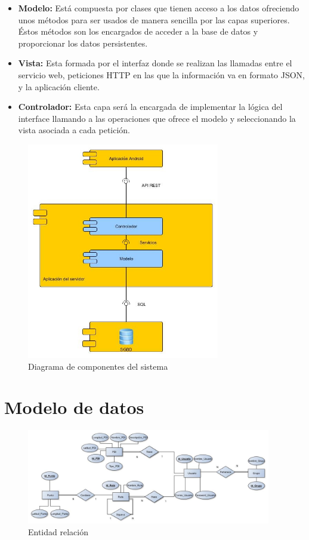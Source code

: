 \begin{itemize}
\item \textbf{Modelo:}
Está compuesta por clases que tienen acceso a los datos ofreciendo unos métodos para ser usados de manera sencilla por las capas superiores. Éstos métodos son los encargados de acceder a la base de datos y proporcionar los datos persistentes.
\item \textbf{Vista:}
Esta formada por el interfaz donde se realizan las llamadas entre el servicio web, peticiones HTTP en las que la información va en formato JSON, y la aplicación cliente.
\item \textbf{Controlador:}
Esta capa será la encargada de implementar la lógica del interface llamando a las operaciones que ofrece el modelo y seleccionando la vista asociada a cada petición.
\end{itemize}
\begin{figure}[H]
		\centering
		\includegraphics[width=0.75\textwidth] {componentes.jpg}
		\caption{Diagrama de componentes del sistema }
	\end{figure}

\section{Modelo de datos}
\begin{figure}[H]
		\centering
		\includegraphics[width=0.95\textwidth] {BD.jpg}
		\caption{Entidad relación  }
	\end{figure}
